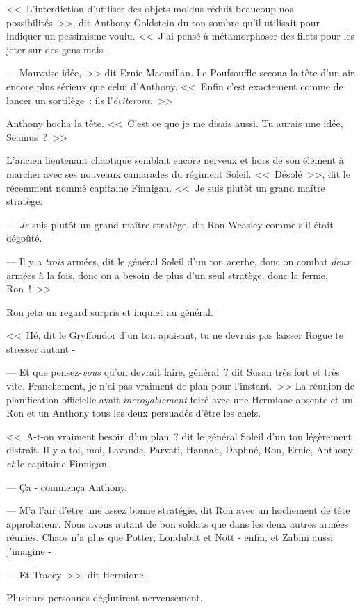 <<~L'interdiction d'utiliser des objets moldus réduit beaucoup nos possibilités~>>, dit Anthony Goldstein du ton sombre qu'il utilisait pour indiquer un pessimisme voulu. <<~J'ai pensé à métamorphoser des filets pour les jeter sur des gens mais -

--- Mauvaise idée,~>> dit Ernie Macmillan. Le Poufsouffle secoua la tête d'un air encore plus sérieux que celui d'Anthony. <<~Enfin c'est exactement comme de lancer un sortilège~: ils l'\emph{éviteront.}~>>

Anthony hocha la tête. <<~C'est ce que je me disais aussi. Tu aurais une idée, Seamus~?~>>

L'ancien lieutenant chaotique semblait encore nerveux et hors de son élément à marcher avec ses nouveaux camarades du régiment Soleil. <<~Désolé~>>, dit le récemment nommé capitaine Finnigan. <<~Je suis plutôt un grand maître stratège.

--- \emph{Je} suis plutôt un grand maître stratège, dit Ron Weasley comme s'il était dégoûté.

--- Il y a \emph{trois} armées, dit le général Soleil d'un ton acerbe, donc on combat \emph{deux} armées à la fois, donc on a besoin de plus d'un seul stratège, donc la ferme, Ron~!~>>

Ron jeta un regard surpris et inquiet au général.

<<~Hé, dit le Gryffondor d'un ton apaisant, tu ne devrais pas laisser Rogue te stresser autant -

--- Et que pensez-\emph{vous} qu'on devrait faire, général~? dit Susan très fort et très vite. Franchement, je n'ai pas vraiment de plan pour l'instant.~>> La réunion de planification officielle avait \emph{incroyablement} foiré avec une Hermione absente et un Ron et un Anthony tous les deux persuadés d'être les chefs.

<<~A-t-on vraiment besoin d'un plan~? dit le général Soleil d'un ton légèrement distrait. Il y a toi, moi, Lavande, Parvati, Hannah, Daphné, Ron, Ernie, Anthony \emph{et} le capitaine Finnigan.

--- Ça - commença Anthony.

--- M'a l'air d'être une assez bonne stratégie, dit Ron avec un hochement de tête approbateur. Nous avons autant de bon soldats que dans les deux autres armées réunies. Chaos n'a plus que Potter, Londubat et Nott - enfin, et Zabini aussi j'imagine -

--- Et Tracey~>>, dit Hermione.

Plusieurs personnes déglutirent nerveusement.

